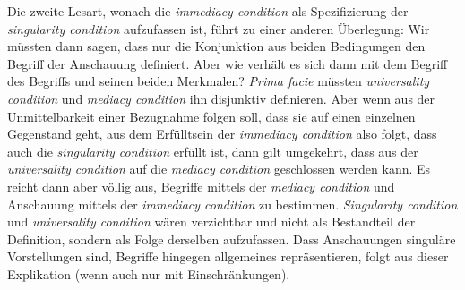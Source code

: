 Die zweite Lesart, wonach die \emph{immediacy condition} als Spezifizierung der
\emph{singularity condition} aufzufassen ist, führt zu einer anderen
Überlegung: Wir müssten dann sagen, dass nur die Konjunktion aus beiden
Bedingungen den Begriff der Anschauung definiert. Aber wie verhält es sich dann
mit dem Begriff des Begriffs und seinen beiden Merkmalen? \emph{Prima facie}
müssten \emph{universality condition} und \emph{mediacy condition} ihn
disjunktiv definieren. Aber wenn aus der Unmittelbarkeit einer Bezugnahme folgen
soll, dass sie auf einen einzelnen Gegenstand geht, aus dem Erfülltsein der
\emph{immediacy condition} also folgt, dass auch die \emph{singularity
condition} erfüllt ist, dann gilt umgekehrt, dass aus der \emph{universality condition} auf
die \emph{mediacy condition} geschlossen werden kann.  Es reicht dann aber
völlig aus, Begriffe mittels der
\emph{mediacy condition} und Anschauung mittels der \emph{immediacy condition}
zu bestimmen. \emph{Singularity condition} und \emph{universality condition}
wären verzichtbar und nicht als Bestandteil der Definition, sondern als Folge
derselben aufzufassen. Dass Anschauungen singuläre Vorstellungen sind, Begriffe hingegen
allgemeines repräsentieren, folgt aus dieser Explikation (wenn auch nur mit
Einschränkungen).


